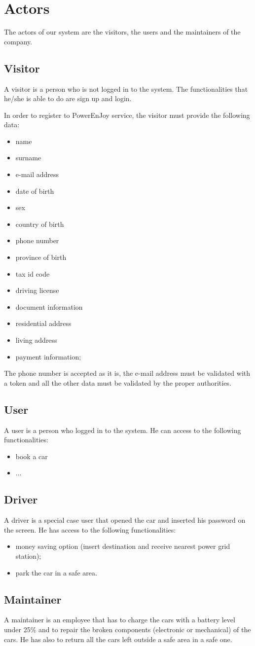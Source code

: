 \section{Actors}
The actors of our system are the visitors, the users and the maintainers of the company.

\subsection{Visitor}
A visitor is a person who is not logged in to the system. The functionalities that he/she is able to do are sign up and login.

In order to register to PowerEnJoy service, the visitor must provide the following data:
\begin{itemize}
	\item name
	\item surname
	\item e-mail address
	\item date of birth
	\item sex
	\item country of birth
	\item phone number
	\item province of birth
	\item tax id code %
	\item driving license
	\item document information
	\item residential address
	\item living address
	\item payment information;
\end{itemize}

The phone number is accepted as it is, the e-mail address must be validated with a token and all
the other data must be validated by the proper authorities.

\subsection{User}
A user is a person who logged in to the system. He can access to the following functionalities:
\begin{itemize}
	\item book a car
	\item ...
\end{itemize}

\subsection{Driver}
A driver is a special case user that opened the car and inserted his password on the screen. He has access to the following functionalities:
\begin{itemize}
	\item money saving option (insert destination and receive nearest power grid station);
	\item park the car in a safe area.
\end{itemize}

\subsection{Maintainer}
A maintainer is an employee that has to charge the cars with a battery level under 25\% and to repair the broken components (electronic or mechanical) of the cars. He has also to return all the cars left outside a safe area in a safe one.